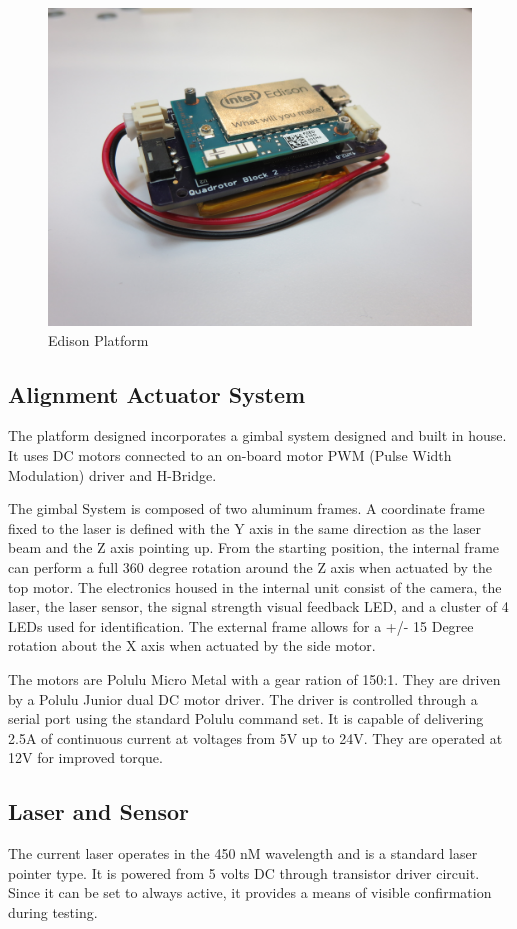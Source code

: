 \documentclass[botnum, fleqn]{unmeethesis}
\begin{document}
\begin{figure}[ht]
 \begin{center}
  \includegraphics[width=0.5 \textwidth]{figures/Edison.JPG}
  \caption{\small \label{fig:edison} Edison Platform}
 \end{center}
\end{figure}

\subsection*{Alignment Actuator System}
The platform designed incorporates a gimbal system designed and built in house. It uses DC motors connected to an on-board motor PWM (Pulse Width Modulation) driver and H-Bridge.

The gimbal System is composed of two aluminum frames. A coordinate frame fixed to the laser is defined with the Y axis in the same direction as the laser beam and the Z axis pointing up. From the starting position, the internal frame can perform a full 360 degree rotation around the Z axis when actuated by the top motor. The electronics housed in the internal unit consist of the camera, the laser, the laser sensor, the signal strength visual feedback LED, and a cluster of 4 LEDs used for identification. The external frame allows for a +/- 15 Degree rotation about the X axis when actuated by the side motor.

The motors are Polulu Micro Metal with a gear ration of 150:1. They are driven by a Polulu Junior dual DC motor driver. The driver is controlled through a serial port using the standard Polulu command set. It is capable of delivering 2.5A of continuous current at voltages from 5V up to 24V. They are operated at 12V for improved torque.

\subsection*{Laser and Sensor}
The current laser operates in the 450 nM wavelength and is a standard laser pointer type. It is powered from 5 volts DC through transistor driver circuit. Since it can be set to always active, it provides a means of visible confirmation during testing. 
\end{document}
